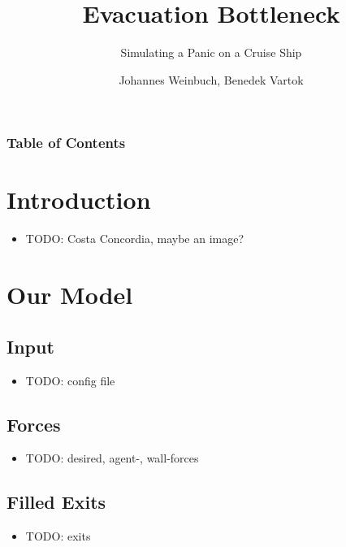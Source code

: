 \documentclass{beamer}
\title{Evacuation Bottleneck}
\subtitle{Simulating a Panic on a Cruise Ship}
\author{Johannes Weinbuch, Benedek Vartok}
\date{}
\begin{document}
 \frame{\titlepage}

 \begin{frame}
	 \frametitle{Table of Contents}
	 \tableofcontents
 \end{frame}

\section{Introduction}

 \begin{frame}
  \begin{itemize}
   \item TODO: Costa Concordia, maybe an image?
  \end{itemize}
 \end{frame}
  
\section{Our Model}

 \subsection{Input}
 \begin{frame}
  \begin{itemize}
   \item TODO: config file
  \end{itemize}
 \end{frame}

 \subsection{Forces}
 \begin{frame}
  \begin{itemize}
   \item TODO: desired, agent-, wall-forces
  \end{itemize}
 \end{frame}

 \subsection{Filled Exits}
 \begin{frame}
  \begin{itemize}
   \item TODO: exits
  \end{itemize}
 \end{frame}
\end{document}
